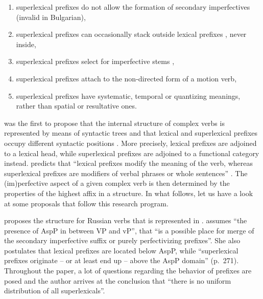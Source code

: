 \begin{enumerate}
\item superlexical prefixes  do not allow the formation of secondary imperfectives  (invalid in Bulgarian), 
\item superlexical prefixes  can occasionally stack outside lexical prefixes , never inside, 
\item superlexical prefixes  select for imperfective stems , 
\item superlexical prefixes  attach to the non-directed form of a motion verb,
\item superlexical prefixes  have systematic, temporal or quantizing meanings, rather than spatial  or resultative  ones.
\end{enumerate}

\citet{Babko-Malaya:99} was the first to propose that the internal structure of complex verbs  is represented by means of syntactic trees  and that lexical and superlexical prefixes  occupy different syntactic positions . More precisely, lexical prefixes  are adjoined to a lexical head, while superlexical prefixes  are adjoined to a functional category instead. \citeauthor{Babko-Malaya:99} predicts that ``lexical prefixes  modify the meaning of the verb, whereas superlexical prefixes  are modifiers of verbal phrases or whole sentences'' \citep[76]{Babko-Malaya:99}. The (im)perfective aspect of a given complex verb is then determined by the properties of the highest affix in a structure. In what follows, let us have a look at some proposals that follow this research program. 

\citet{Romanova:04} proposes the structure for Russian verbs that is represented in . \citet[272]{Romanova:04} assumes ``the presence of AspP in between VP and vP'', that ``is a possible place for merge of the secondary imperfective  suffix or purely perfectivizing prefixes''. She also postulates that lexical prefixes  are located below AspP, while ``superlexical prefixes  originate -- or at least end up -- above the AspP domain'' (p.~271). Throughout the paper, a lot of questions regarding the behavior of prefixes are posed and the author arrives at the conclusion that ``there is no uniform distribution of all superlexicals''.

